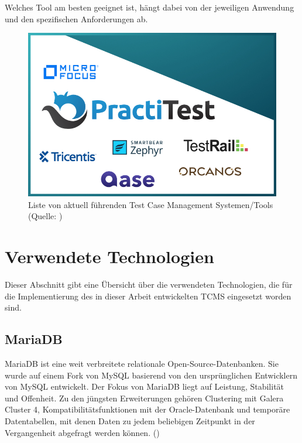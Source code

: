 \documentclass[a4paper, fontsize=11pt, parskip=half, twoside, headings=openright]{scrreprt}
\begin{document}
	Welches Tool am besten geeignet ist, hängt dabei von der jeweiligen Anwendung und den spezifischen Anforderungen ab.
	\newline
	\begin{figure}[ht]
		\centering
		\includegraphics[scale=0.5]{assets/best-tool-logos.jpg}
		\caption{Liste von aktuell führenden Test Case Management Systemen/Tools (Quelle: \textcite{noauthor_7_nodate})}
		\label{fig:tcms_logo}
	\end{figure}
	 
	
	\section{Verwendete Technologien} \label{sec:technologies}
	Dieser Abschnitt gibt eine Übersicht über die verwendeten Technologien, die für die Implementierung des in dieser Arbeit entwickelten \ac{TCMS} eingesetzt worden sind.
	
	\subsection{MariaDB}
	MariaDB ist eine weit verbreitete relationale Open-Source-Datenbanken. 
	Sie wurde auf einem Fork von MySQL basierend von den ursprünglichen Entwicklern von MySQL entwickelt. 
	Der Fokus von MariaDB liegt auf Leistung, Stabilität und Offenheit. 
	Zu den jüngsten Erweiterungen gehören Clustering mit Galera Cluster 4, Kompatibilitätsfunktionen mit der Oracle-Datenbank und temporäre Datentabellen, mit denen Daten zu jedem beliebigen Zeitpunkt in der Vergangenheit abgefragt werden können. (\textcite{noauthor_mariadb_nodate})
	
\end{document}
